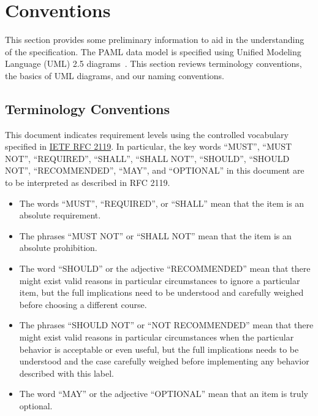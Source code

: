 \section{Conventions}

This section provides some preliminary information to aid in the understanding of the specification.
The PAML data model is specified using Unified Modeling Language (UML) 2.5 diagrams~\citep{uml251}. This section reviews terminology conventions, the basics of UML diagrams, and our naming conventions.

\subsection{Terminology Conventions}

This document indicates requirement levels using the controlled vocabulary specified in \href{https://tools.ietf.org/html/rfc2119}{IETF RFC 2119}.
In particular, the key words ``MUST'', ``MUST NOT'', ``REQUIRED'', ``SHALL'', ``SHALL NOT'', ``SHOULD'', ``SHOULD NOT'', ``RECOMMENDED'', ``MAY'', and ``OPTIONAL'' in this document are to be interpreted as described in RFC 2119.

\begin{itemize}
\item The words ``MUST'', ``REQUIRED'', or ``SHALL'' mean that the item is an absolute requirement.
\item The phrases ``MUST NOT'' or ``SHALL NOT'' mean that the item is an absolute prohibition.
\item The word ``SHOULD'' or the adjective ``RECOMMENDED'' mean that there might exist valid reasons in particular circumstances to ignore a particular item, but the full implications need to be understood and carefully weighed before choosing a different course.
\item The phrases ``SHOULD NOT'' or ``NOT RECOMMENDED'' mean that there might exist valid reasons in particular circumstances when the particular behavior is acceptable or even useful, but the full implications needs to be understood and the case carefully weighed before implementing any behavior described with this label.
\item The word ``MAY'' or the adjective ``OPTIONAL'' mean that an item is truly optional.
\end{itemize}

